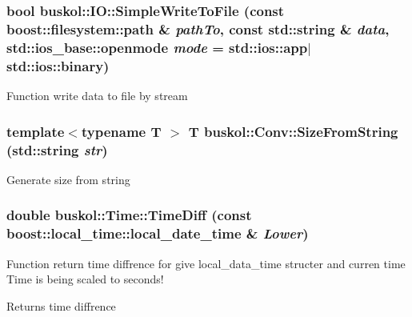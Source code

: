 \hypertarget{group__libbuskol_ga5ac0350b87e4d108b9e975916ee0e7f5}{
\subsubsection[{SimpleWriteToFile}]{\setlength{\rightskip}{0pt plus 5cm}bool buskol::IO::SimpleWriteToFile (const boost::filesystem::path \& {\em pathTo}, \/  const std::string \& {\em data}, \/  std::ios\_\-base::openmode {\em mode} = {\ttfamily std::ios::app$|$std::ios::binary})}}
\label{group__libbuskol_ga5ac0350b87e4d108b9e975916ee0e7f5}
Function write data to file by stream \hypertarget{group__libbuskol_gaed62db74cfcb8c4767ed9f8ddd19cbcb}{
\subsubsection[{SizeFromString}]{\setlength{\rightskip}{0pt plus 5cm}template$<$typename T $>$ T buskol::Conv::SizeFromString (std::string {\em str})}}
\label{group__libbuskol_gaed62db74cfcb8c4767ed9f8ddd19cbcb}
Generate size from string \hypertarget{group__libbuskol_ga4fe6f31191f95b9231ac7c44629ef203}{
\subsubsection[{TimeDiff}]{\setlength{\rightskip}{0pt plus 5cm}double buskol::Time::TimeDiff (const boost::local\_\-time::local\_\-date\_\-time \& {\em Lower})}}
\label{group__libbuskol_ga4fe6f31191f95b9231ac7c44629ef203}
Function return time diffrence for give local\_\-data\_\-time structer and curren time Time is being scaled to seconds! 

Returns time diffrence 

